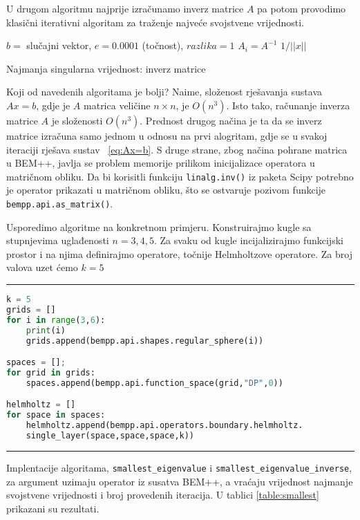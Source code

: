\documentclass[a4paper,twoside,12pt]{memoir} %
\begin{document}
U drugom algoritmu najprije izračunamo inverz matrice $A$ pa potom provodimo klasični iterativni algoritam za traženje najveće svojstvene vrijednosti.\\

\begin{algorithm}[H]
\SetAlgoLined
{}
 	$b=$ slučajni vektor,  $e = 0.0001$ (točnost), $razlika = 1$\;
 	$A_{i}=A^{-1}$ \;
 	\Return $1/||x||$
 \caption{Najmanja singularna vrijednost: inverz matrice }
\end{algorithm}
\newpage

Koji od navedenih algoritama je bolji? Naime, složenost rješavanja sustava $Ax=b$, gdje je $A$ matrica veličine $n \times n$, je $O(n^{3})$. Isto tako, računanje inverza matrice $A$ je složenosti $O(n^{3})$. Prednost drugog načina je ta da se inverz matrice izračuna samo jednom u odnosu na prvi alogritam, gdje se u svakoj iteraciji rješava sustav ~\ref{eq:Ax=b}. S druge strane, zbog načina pohrane matrica u BEM++, javlja se problem memorije prilikom inicijalizace operatora u matričnom obliku. Da bi korisitli funkciju \texttt{linalg.inv()} iz paketa Scipy potrebno je operator prikazati u matričnom obliku, što se ostvaruje pozivom funkcije \texttt{bempp.api.as\_matrix()}. 

Usporedimo algoritme na konkretnom primjeru. Konstruirajmo kugle sa stupnjevima uglađenosti $n=3, 4, 5$. Za svaku od kugle incijalizirajmo funkcijski prostor i na njima definirajmo operatore, točnije Helmholtzove operatore. Za broj valova uzet ćemo $k=5$
\vspace{.5cm}

\hrule
\begin{lstlisting}[language=Python]
k = 5
grids = []
for i in range(3,6):
    print(i)
    grids.append(bempp.api.shapes.regular_sphere(i))

spaces = [];
for grid in grids:
    spaces.append(bempp.api.function_space(grid,"DP",0))

helmholtz = []   
for space in spaces:
    helmholtz.append(bempp.api.operators.boundary.helmholtz.
    single_layer(space,space,space,k))
\end{lstlisting}
\hrule
\vspace{.5cm}

Implentacije algoritama, \texttt{smallest\_eigenvalue} i \texttt{smallest\_eigenvalue\_inverse}, za argument uzimaju operator iz susatva BEM++, a vraćaju vrijednost najmanje svojstvene vrijednosti i broj provedenih iteracija. U tablici \ref{table:smallest} prikazani su rezultati.
\newpage
\end{document}
